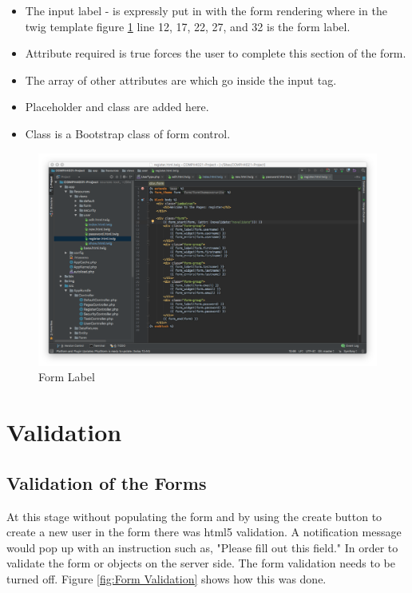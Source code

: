 \begin{itemize}
  \item The input label - is expressly put in with the form rendering where in the twig template figure \ref{fig:Form Label} line 12, 17, 22, 27, and 32 is the form label.
    \item Attribute required is true forces the user to complete this section of the form.
      \item The array of other attributes are which go inside the input tag.
        \item Placeholder and class are added here.
          \item Class is a Bootstrap class of form control.
\end{itemize}

\begin{figure}[htbp]
   \centering
   \includegraphics[width=400pt]{figures/form_label.png} %
   \caption{Form Label}
   \label{fig:Form Label}
\end{figure}

\section{Validation}

\subsection{Validation of the Forms}

At this stage without populating the form and by using the create button to create a new user in the form there was html5 validation. A notification message would pop up with an instruction such as, "Please fill out this field." In order to validate the form or objects on the server side. The form validation needs to be turned off. Figure \ref{fig:Form Validation} shows how this was done.

